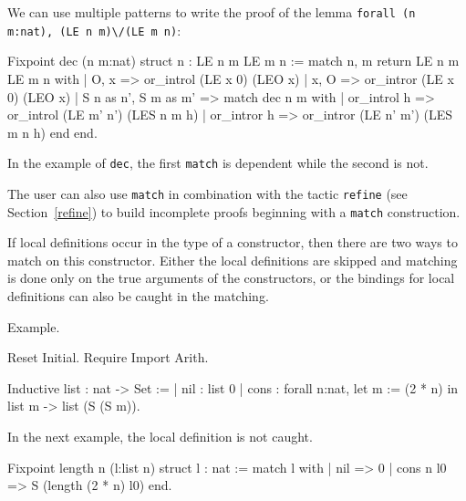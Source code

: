 We can use multiple patterns to write  the proof of the lemma
 \texttt{forall (n m:nat), (LE n m)}\verb=\/=\texttt{(LE m n)}:

\begin{coq_example}
Fixpoint dec (n m:nat) {struct n} : LE n m \/ LE m n :=
  match n, m return LE n m \/ LE m n with
  | O, x => or_introl (LE x 0) (LEO x)
  | x, O => or_intror (LE x 0) (LEO x)
  | S n as n', S m as m' =>
      match dec n m with
      | or_introl h => or_introl (LE m' n') (LES n m h)
      | or_intror h => or_intror (LE n' m') (LES m n h)
      end
  end.
\end{coq_example}
In the example of \texttt{dec},
the first \texttt{match} is dependent while 
the second is not.


The user can also use \texttt{match} in combination with the tactic
\texttt{refine} (see Section~\ref{refine}) to build incomplete proofs
beginning with a \texttt{match} construction.


If local definitions occur in the type of a constructor, then there
are two ways to match on this constructor. Either the local
definitions are skipped and matching is done only on the true arguments
of the constructors, or the bindings for local definitions can also
be caught in the matching.

Example.

\begin{coq_eval}
Reset Initial.
Require Import Arith.
\end{coq_eval}

\begin{coq_example*}
Inductive list : nat -> Set :=
  | nil : list 0
  | cons : forall n:nat, let m := (2 * n) in list m -> list (S (S m)).
\end{coq_example*}

In the next example, the local definition is not caught.

\begin{coq_example}
Fixpoint length n (l:list n) {struct l} : nat :=
  match l with
  | nil => 0
  | cons n l0 => S (length (2 * n) l0)
  end.
\end{coq_example}

